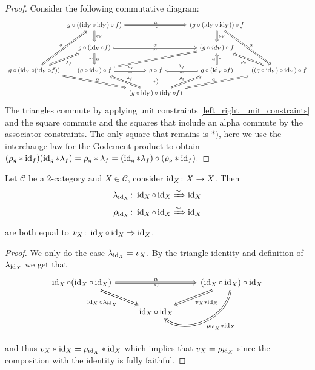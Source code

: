\begin{proof}
	Consider the following commutative diagram:
	\[
	\begin{tikzcd}[column sep= 0.1cm]
		& 
		g \circ ( ( \id_Y \circ \id_Y ) \circ f )
		\ar[rr, Rightarrow, "\alpha", "\sim"']
		\ar[d, Rightarrow, "v_Y"]
		&&
		( g \circ ( \id_Y \circ \id_Y ) ) \circ f 
		\ar[d, Rightarrow, "u_Y" ]
		\ar[rdd, Rightarrow, "\alpha"]
		\\
		&
		g \circ ( \id_Y \circ f )
		\ar[rr,Rightarrow, "\alpha", "\sim"']
		\ar[d, Rightarrow, "\alpha", "\sim"']
		&&
		( g \circ id_Y ) \circ f
		\\
		g \circ ( \id_Y \circ ( \id_Y \circ f ))
		\ar[ruu, Rightarrow, "\alpha"]
		\ar[ru, Rightarrow, "\lambda_f"']
		\ar[rrd, Rightarrow, "\alpha"]
		& 
		( g \circ \id_Y ) \circ f
		\ar[rru, equal]
		\ar[r, Rightarrow ,"\rho_g", " \sim"']
		&
		g \circ f 
		&
		g \circ ( \id_Y \circ f )
		\ar[ u , Rightarrow, "\alpha" , "\sim"']
		\ar[l, Rightarrow, "\lambda_f"' , "\sim"]
		&
		((g \circ \id_Y ) \circ \id_Y ) \circ f
		\ar[lu, Rightarrow, " \rho_g"]
		\\
		&&
		(g \circ \id_Y ) \circ ( \id_Y \circ f)
		\ar[lu, Rightarrow, " \lambda_f"']
		\ar[ru, Rightarrow, "\rho_g"]
		\ar[rru, Rightarrow, " \alpha"]
		\ar[u, phantom, "{*)}"]
	\end{tikzcd}
	\]
	The triangles commute by applying unit constraints  \cref{left_right_unit_constraints} and the square commute 
	and the squares that include an alpha commute by the associator constraints. 
	The only square that remains is $ *) $, here we use the interchange law for the Godement product to obtain $ ( \rho_g * \operatorname{id}_{f} ) ( \operatorname{id}_{g} * \lambda_f ) = \rho_g * \lambda_f = ( \operatorname{id}_{g} * \lambda_f ) \circ ( \rho_g * \operatorname{id}_f )$.
\end{proof}

\begin{cor}
	Let $ \mathcal{ C } $ be a 2-category and $ X \in \mathcal{ C }$, consider $ \operatorname{id}_X \colon X \to X $.
	Then 
	\begin{align*}
			\lambda_{ \operatorname{id}_X} \colon \operatorname{id}_X \circ \operatorname{id}_X 
			&\xRightarrow{\sim }
			\operatorname{id}_X
			\\
			\rho_{ \operatorname{id}_X} \colon \operatorname{id}_X \circ \operatorname{id}_X
			&\xRightarrow{\sim}
			\operatorname{id}_X
	\end{align*} 
	are both equal to $v_X \colon \operatorname{id}_X \circ \operatorname{id}_X \Rightarrow \operatorname{id}_X$.
\end{cor}

\begin{proof}
	We only do the case $ \lambda_{\operatorname{id}_X}= v_X $.
	By the triangle identity and definition of $ \lambda_{ \operatorname{id}_X} $
	we get that 
	\[
	\begin{tikzcd}	
		\id_X \circ ( \id_X \circ \id_X )
		\ar[rr, Rightarrow, "\alpha", "\sim"']
		\ar[rd, Rightarrow, "\id_X \circ \lambda_{ \id_X}"']
		&&
		(\id_X \circ \id_X ) \circ \id_X
		\ar[dl, Rightarrow," v_X * \id_X"]
		\ar[dl, Rightarrow, bend left=60, " \rho_{\id_X} * \id_X"]
		\\
		&
		\id_X \circ \id_X
	\end{tikzcd}	
	\]
	and thus $ v_X * \operatorname{id}_X = \rho_{\operatorname{id}_X} * \operatorname{id}_X$ which implies that $v_X = \rho_{ \operatorname{id}_X}$ since the composition with the identity is fully faithful.
\end{proof}


